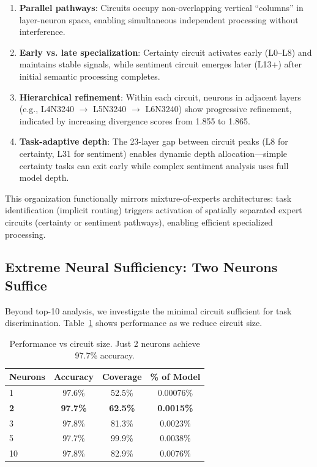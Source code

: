 \documentclass{article}
\begin{document}
\begin{enumerate}
    \item \textbf{Parallel pathways}: Circuits occupy non-overlapping vertical ``columns'' in layer-neuron space, enabling simultaneous independent processing without interference.
    
    \item \textbf{Early vs. late specialization}: Certainty circuit activates early (L0--L8) and maintains stable signals, while sentiment circuit emerges later (L13+) after initial semantic processing completes.
    
    \item \textbf{Hierarchical refinement}: Within each circuit, neurons in adjacent layers (e.g., L4N3240 $\rightarrow$ L5N3240 $\rightarrow$ L6N3240) show progressive refinement, indicated by increasing divergence scores from 1.855 to 1.865.
    
    \item \textbf{Task-adaptive depth}: The 23-layer gap between circuit peaks (L8 for certainty, L31 for sentiment) enables dynamic depth allocation—simple certainty tasks can exit early while complex sentiment analysis uses full model depth.
\end{enumerate}

This organization functionally mirrors mixture-of-experts architectures: task identification (implicit routing) triggers activation of spatially separated expert circuits (certainty or sentiment pathways), enabling efficient specialized processing.

\subsection{Extreme Neural Sufficiency: Two Neurons Suffice}

Beyond top-10 analysis, we investigate the minimal circuit sufficient for task discrimination. Table~\ref{tab:neurons} shows performance as we reduce circuit size.

\begin{table}[h]
\centering
\begin{tabular}{@{}lccc@{}}
\toprule
\textbf{Neurons} & \textbf{Accuracy} & \textbf{Coverage} & \textbf{\% of Model} \\
\midrule
1 & 97.6\% & 52.5\% & 0.00076\% \\
\textbf{2} & \textbf{97.7\%} & \textbf{62.5\%} & \textbf{0.0015\%} \\
3 & 97.8\% & 81.3\% & 0.0023\% \\
5 & 97.7\% & 99.9\% & 0.0038\% \\
10 & 97.8\% & 82.9\% & 0.0076\% \\
\bottomrule
\end{tabular}
\caption{Performance vs circuit size. Just 2 neurons achieve 97.7\% accuracy.}
\label{tab:neurons}
\end{table}
\end{document}
